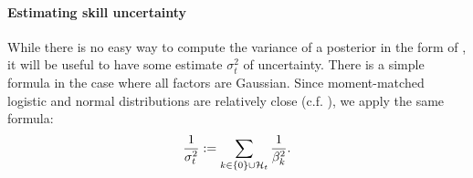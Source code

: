 
\paragraph{Estimating skill uncertainty} While there is no easy way to compute the variance of a posterior in the form of , it will be useful to have some estimate $\sigma_t^2$ of uncertainty. There is a simple formula in the case where all factors are Gaussian. Since moment-matched logistic and normal distributions are relatively close (c.f. ), we apply the same formula:
\begin{equation}
\label{eq:variance}
\frac{1}{\sigma_t^2} := \sum_{k\in\{0\}\cup{\mathcal{H}}_t}\frac{1}{\beta_k^2}.
\end{equation}